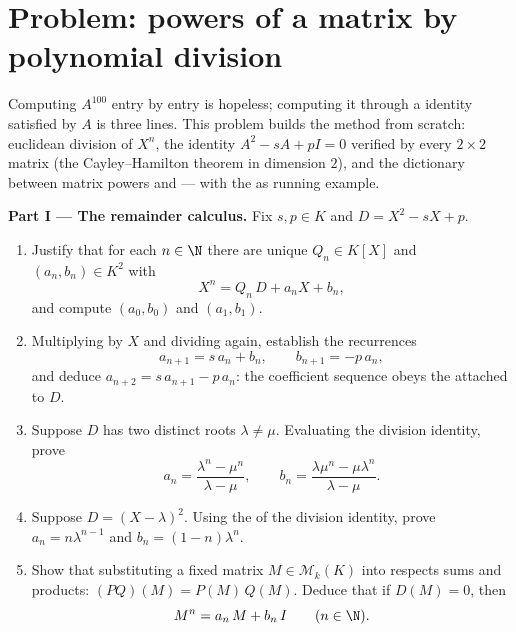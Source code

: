 \section{Problem: powers of a matrix by polynomial division}

\begin{problem}\label{pb:b1:matrices:1}
Computing $A^{100}$ entry by entry is hopeless; computing it
through a  identity satisfied by $A$ is three lines.
This problem builds the method from scratch: euclidean division
of $X^n$, the identity $A^2 - sA + pI = 0$ verified by every $2
\times 2$ matrix (the Cayley--Hamilton theorem in dimension
$2$), and the dictionary between matrix powers and  --- with the  as running example.

\medskip
\noindent\textbf{Part I --- The remainder calculus.} Fix $s, p
\in K$ and $D = X^2 - sX + p$.
\begin{enumerate}
  \item Justify that for each $n \in \N$ there are unique $Q_n
        \in K[X]$ and $(a_n, b_n) \in K^2$ with
        \[
        X^n = Q_n\,D + a_n X + b_n ,
        \]
        and compute $(a_0, b_0)$ and $(a_1, b_1)$.
  \item Multiplying by $X$ and dividing again, establish the
        recurrences
        \[
        a_{n+1} = s\,a_n + b_n,
        \qquad
        b_{n+1} = -p\,a_n ,
        \]
        and deduce $a_{n+2} = s\,a_{n+1} - p\,a_n$: the
        coefficient sequence obeys the  attached
        to $D$.
  \item Suppose $D$ has two distinct roots $\lambda \neq \mu$.
        Evaluating the division identity, prove
        \[
        a_n = \frac{\lambda^n - \mu^n}{\lambda - \mu},
        \qquad
        b_n = \frac{\lambda\mu^n - \mu\lambda^n}{\lambda - \mu} .
        \]
  \item Suppose $D = (X - \lambda)^2$. Using the  of
        the division identity, prove $a_n = n\lambda^{n-1}$ and
        $b_n = (1 - n)\lambda^{n}$.
  \item Show that substituting a fixed matrix $M \in
        \mathcal{M}_k(K)$ into  respects sums and
        products: $(PQ)(M) = P(M)\,Q(M)$. Deduce that if $D(M) =
        0$, then
        \[
        M^n = a_n\,M + b_n\,I \qquad (n \in \N).
        \]
\end{enumerate}


\end{problem}

